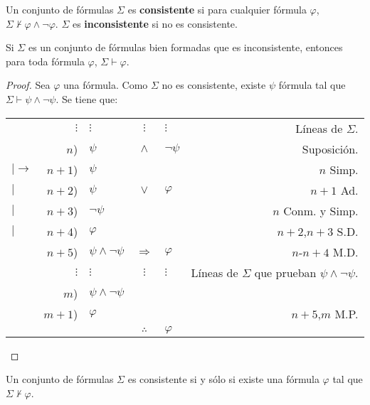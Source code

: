 \documentclass[12pt]{report}
\theoremstyle{largebreak}
\begin{document}
    \begin{mydef}
        Un conjunto de fórmulas $\Sigma$ es \textbf{consistente} si para cualquier fórmula $\varphi$, $\Sigma\nvdash\varphi\land\neg\varphi$. $\Sigma$ es \textbf{inconsistente} si no es consistente.
    \end{mydef}

    \begin{theor}
        Si $\Sigma$ es un conjunto de fórmulas bien formadas que es inconsistente, entonces para toda fórmula $\varphi$, $\Sigma\vdash\varphi$.
    \end{theor}

    \begin{proof}
        Sea $\varphi$ una fórmula. Como $\Sigma$ no es consistente, existe $\psi$ fórmula tal que $\Sigma\vdash\psi\land\neg\psi$. Se tiene que:
        \begin{center}
            \begin{tabular}{l r l c l r}
                & $\vdots$ & $\vdots$ & $\vdots$ & $\vdots$ & Líneas de $\Sigma$. \\
                & $n$) & $\psi$ & $\land$ & $\neg\psi$ & Suposición. \\
                $|\longrightarrow$ & $n+1$) & $\psi$ &  &  & $n$ Simp. \\
                $|$ & $n+2$) & $\psi$ & $\lor$ & $\varphi$ & $n+1$ Ad. \\
                $|$ & $n+3$) & $\neg\psi$ &  &  & $n$ Conm. y Simp. \\
                $|$ & $n+4$) & $\varphi$ &  &  & $n+2$,$n+3$ S.D. \\
                \hline
                & $n+5$) & $\psi\land\neg\psi$ & $\Rightarrow$ & $\varphi$ & $n$-$n+4$ M.D. \\
                & $\vdots$ & $\vdots$ & $\vdots$ & $\vdots$ & Líneas de $\Sigma$ que prueban $\psi\land\neg\psi$. \\
                & $m$) & $\psi\land\neg\psi$ &  &  &  \\
                & $m+1$) & $\varphi$ &  &  & $n+5$,$m$ M.P. \\
                \hline
                & & & $\therefore$ & $\varphi$ & \\
            \end{tabular}
        \end{center}
    \end{proof}

    \begin{cor}
        Un conjunto de fórmulas $\Sigma$ es consistente si y sólo si existe una fórmula $\varphi$ tal que $\Sigma\nvdash\varphi$.
    \end{cor}
\end{document}
